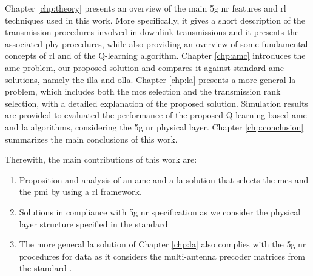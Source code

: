 Chapter \ref{chp:theory} presents an overview of the main \gls{5g} \gls{nr} features and \gls{rl} techniques used in this work.
%
More specifically, it gives a short description of the transmission procedures involved in downlink transmissions and it presents the associated \gls{phy} procedures, while also providing an overview of some fundamental concepts of \gls{rl} and of the Q-learning algorithm.
%
Chapter \ref{chp:amc} introduces the \gls{amc} problem, our proposed solution and compares it against standard \gls{amc} solutions, namely the \gls{illa} and \gls{olla}.
%
Chapter \ref{chp:la} presents a more general \gls{la} problem, which includes both the \gls{mcs} selection and the transmission rank selection, with a detailed explanation of the proposed solution.
%
Simulation results are provided to evaluated the performance of the proposed Q-learning based \gls{amc} and \gls{la} algorithms, considering the \gls{5g} \gls{nr} physical layer.
%
Chapter \ref{chp:conclusion} summarizes the main conclusions of this work.

Therewith, the main contributions of this work are:
\begin{enumerate}
    \item Proposition and analysis of an \gls{amc} and a \gls{la} solution that selects the \gls{mcs} and the \gls{pmi} by using a \gls{rl} framework.
    \item Solutions in compliance with \gls{5g} \gls{nr} specification as we consider the physical layer structure specified in the standard \cite{3gpp.38.212}
    \item The more general \gls{la} solution of Chapter \ref{chp:la} also complies with the \gls{5g} \gls{nr} procedures for data as it considers the multi-antenna precoder matrices from the standard \cite{3gpp.38.214}.
\end{enumerate}
%

